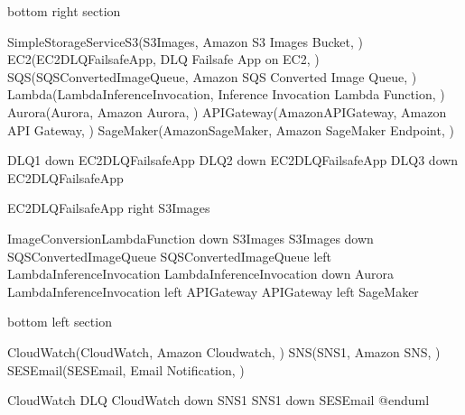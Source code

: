 \documentclass[letterpaper,10pt,english]{sphinxmanual}
\begin{document}
\begin{sphinxVerbatim}[commandchars=\\\{\},numbers=left,firstnumber=1,stepnumber=1]
\PYGZsq{}bottom right section 
\PYGZsq{}\PYGZhy{}\PYGZhy{}\PYGZhy{}\PYGZhy{}\PYGZhy{}\PYGZhy{}\PYGZhy{}\PYGZhy{}\PYGZhy{}\PYGZhy{}\PYGZhy{}\PYGZhy{}\PYGZhy{}\PYGZhy{}\PYGZhy{}\PYGZhy{}\PYGZhy{}\PYGZhy{}\PYGZhy{}\PYGZhy{}\PYGZhy{}\PYGZhy{}\PYGZhy{}\PYGZhy{}\PYGZhy{}\PYGZhy{}\PYGZhy{}\PYGZhy{}\PYGZhy{}\PYGZhy{}\PYGZhy{}\PYGZhy{}\PYGZhy{}\PYGZhy{}\PYGZhy{}\PYGZhy{}\PYGZhy{}\PYGZhy{}\PYGZhy{}\PYGZhy{}\PYGZhy{}\PYGZhy{}\PYGZhy{}\PYGZhy{}\PYGZhy{}\PYGZhy{}\PYGZhy{}\PYGZhy{}\PYGZhy{}\PYGZhy{}\PYGZhy{}\PYGZhy{}\PYGZhy{}\PYGZhy{}\PYGZhy{}\PYGZhy{}\PYGZhy{}\PYGZhy{}\PYGZhy{}\PYGZhy{}\PYGZhy{}

SimpleStorageServiceS3(S3Images, \PYGZdq{}Amazon S3 Images Bucket\PYGZdq{}, \PYGZdq{} \PYGZdq{})
EC2(EC2DLQFailsafeApp, \PYGZdq{}DLQ Failsafe App on EC2\PYGZdq{}, \PYGZdq{} \PYGZdq{})
SQS(SQSConvertedImageQueue, \PYGZdq{}Amazon SQS Converted Image Queue\PYGZdq{}, \PYGZdq{} \PYGZdq{})
Lambda(LambdaInferenceInvocation, \PYGZdq{}Inference Invocation Lambda Function\PYGZdq{}, \PYGZdq{} \PYGZdq{})
Aurora(Aurora, \PYGZdq{}Amazon Aurora\PYGZdq{}, \PYGZdq{} \PYGZdq{})
APIGateway(AmazonAPIGateway, \PYGZdq{}Amazon API Gateway\PYGZdq{}, \PYGZdq{}\PYGZdq{})
SageMaker(AmazonSageMaker, \PYGZdq{}Amazon SageMaker Endpoint\PYGZdq{}, \PYGZdq{}\PYGZdq{})

DLQ1 \PYGZhy{}down\PYGZhy{}\PYGZgt{} EC2DLQFailsafeApp
DLQ2 \PYGZhy{}down\PYGZhy{}\PYGZgt{} EC2DLQFailsafeApp
DLQ3 \PYGZhy{}down\PYGZhy{}\PYGZgt{} EC2DLQFailsafeApp

EC2DLQFailsafeApp \PYGZhy{}right\PYGZhy{}\PYGZgt{} S3Images

ImageConversionLambdaFunction \PYGZhy{}down\PYGZhy{}\PYGZgt{} S3Images
S3Images \PYGZhy{}down\PYGZhy{}\PYGZgt{} SQSConvertedImageQueue
SQSConvertedImageQueue \PYGZhy{}left\PYGZhy{}\PYGZgt{} LambdaInferenceInvocation
LambdaInferenceInvocation \PYGZhy{}down\PYGZhy{}\PYGZgt{} Aurora
\PYGZsq{}LambdaInferenceInvocation \PYGZhy{}left\PYGZhy{}\PYGZgt{} APIGateway
\PYGZsq{}APIGateway \PYGZhy{}left\PYGZhy{}\PYGZgt{} SageMaker


\PYGZsq{}bottom left section 
\PYGZsq{}\PYGZhy{}\PYGZhy{}\PYGZhy{}\PYGZhy{}\PYGZhy{}\PYGZhy{}\PYGZhy{}\PYGZhy{}\PYGZhy{}\PYGZhy{}\PYGZhy{}\PYGZhy{}\PYGZhy{}\PYGZhy{}\PYGZhy{}\PYGZhy{}\PYGZhy{}\PYGZhy{}\PYGZhy{}\PYGZhy{}\PYGZhy{}\PYGZhy{}\PYGZhy{}\PYGZhy{}\PYGZhy{}\PYGZhy{}\PYGZhy{}\PYGZhy{}\PYGZhy{}\PYGZhy{}\PYGZhy{}\PYGZhy{}\PYGZhy{}\PYGZhy{}\PYGZhy{}\PYGZhy{}\PYGZhy{}\PYGZhy{}\PYGZhy{}\PYGZhy{}\PYGZhy{}\PYGZhy{}\PYGZhy{}\PYGZhy{}\PYGZhy{}\PYGZhy{}\PYGZhy{}\PYGZhy{}\PYGZhy{}\PYGZhy{}\PYGZhy{}\PYGZhy{}\PYGZhy{}\PYGZhy{}\PYGZhy{}\PYGZhy{}\PYGZhy{}\PYGZhy{}\PYGZhy{}\PYGZhy{}\PYGZhy{}

CloudWatch(CloudWatch, \PYGZdq{}Amazon Cloudwatch\PYGZdq{}, \PYGZdq{} \PYGZdq{})
SNS(SNS1, \PYGZdq{}Amazon SNS\PYGZdq{}, \PYGZdq{}\PYGZdq{})
SESEmail(SESEmail, \PYGZdq{}Email Notification\PYGZdq{}, \PYGZdq{}\PYGZdq{})

CloudWatch \PYGZhy{}\PYGZhy{}\PYGZgt{} DLQ
CloudWatch \PYGZhy{}down\PYGZhy{}\PYGZgt{} SNS1
SNS1 \PYGZhy{}down\PYGZhy{}\PYGZgt{} SESEmail
@enduml
\end{sphinxVerbatim}
\end{document}
